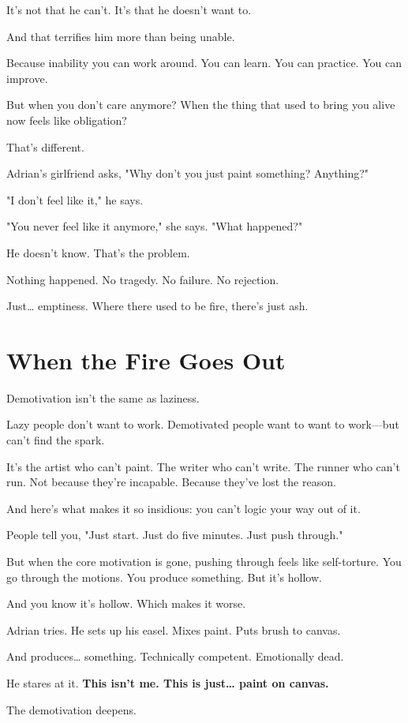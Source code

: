 \documentclass[11pt,twoside]{book}
\begin{document}
It's not that he can't. It's that he doesn't want to.

And that terrifies him more than being unable.

Because inability you can work around. You can learn. You can practice. You can improve.

But when you don't care anymore? When the thing that used to bring you alive now feels like obligation?

That's different.

Adrian's girlfriend asks, "Why don't you just paint something? Anything?"

"I don't feel like it," he says.

"You never feel like it anymore," she says. "What happened?"

He doesn't know. That's the problem.

Nothing happened. No tragedy. No failure. No rejection.

Just\ldots{} emptiness. Where there used to be fire, there's just ash.

\section*{When the Fire Goes Out}

Demotivation isn't the same as laziness.

Lazy people don't want to work. Demotivated people want to want to work—but can't find the spark.

It's the artist who can't paint. The writer who can't write. The runner who can't run. Not because they're incapable. Because they've lost the reason.

And here's what makes it so insidious: you can't logic your way out of it.

People tell you, "Just start. Just do five minutes. Just push through."

But when the core motivation is gone, pushing through feels like self-torture. You go through the motions. You produce something. But it's hollow.

And you know it's hollow. Which makes it worse.

Adrian tries. He sets up his easel. Mixes paint. Puts brush to canvas.

And produces\ldots{} something. Technically competent. Emotionally dead.

He stares at it. \textbf{This isn't me. This is just\ldots{} paint on canvas.}

The demotivation deepens.
\end{document}
